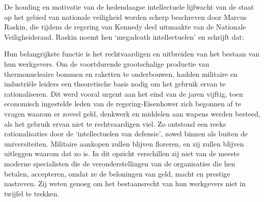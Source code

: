 \documentclass[
  a5paper,
  smalldemyvopaper,10pt,twoside,onecolumn,openright,extrafontsizes,hidelinks]{memoir}
\renewenvironment{quote}%
               {\list{}{\rightmargin=.6cm\leftmargin=.6cm}%
                \itshape \item[]}%
               {\endlist}
\begin{document}
De houding en motivatie van de hedendaagse intellectuele lijfwacht van
de staat op het gebied van nationale veiligheid worden scherp beschreven
door Marcus Raskin, die tijdens de regering van Kennedy deel uitmaakte
van de Nationale Veiligheidsraad. Raskin noemt hen `megadeath
intellectuelen' en schrijft dat:

\begin{quote}
Hun belangrijkste functie is het rechtvaardigen en uitbreiden van het
bestaan van hun werkgevers. Om de voortdurende grootschalige productie
van thermonucleaire bommen en raketten te onderbouwen, hadden militaire
en industriële leiders een theoretische basis nodig om het gebruik ervan
te rationaliseren. Dit werd vooral urgent aan het eind van de jaren
vijftig, toen economisch ingestelde leden van de regering-Eisenhower
zich begonnen af te vragen waarom er zoveel geld, denkwerk en middelen
aan wapens werden besteed, als het gebruik ervan niet te rechtvaardigen
viel. Zo ontstond een reeks rationalisaties door de `intellectuelen van
defensie', zowel binnen als buiten de universiteiten. Militaire aankopen
zullen blijven floreren, en zij zullen blijven uitleggen waarom dat zo
is. In dit opzicht verschillen zij niet van de meeste moderne
specialisten die de veronderstellingen van de organisaties die hen
betalen, accepteren, omdat ze de beloningen van geld, macht en prestige
nastreven. Zij weten genoeg om het bestaansrecht van hun werkgevers niet
in twijfel te trekken.
\end{quote}
\end{document}
